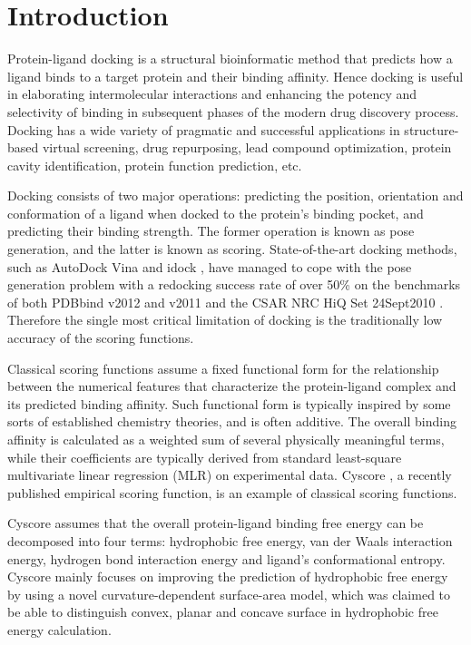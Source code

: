 \documentclass[journal=jacsat,manuscript=article]{achemso}
\begin{document}
\section{Introduction}

Protein-ligand docking is a structural bioinformatic method that predicts how a ligand binds to a target protein and their binding affinity. Hence docking is useful in elaborating intermolecular interactions and enhancing the potency and selectivity of binding in subsequent phases of the modern drug discovery process. Docking has a wide variety of pragmatic and successful applications in structure-based virtual screening, drug repurposing, lead compound optimization, protein cavity identification, protein function prediction, etc.

Docking consists of two major operations: predicting the position, orientation and conformation of a ligand when docked to the protein's binding pocket, and predicting their binding strength. The former operation is known as pose generation, and the latter is known as scoring. State-of-the-art docking methods, such as AutoDock Vina \cite{595} and idock \cite{1153}, have managed to cope with the pose generation problem with a redocking success rate of over 50\% \cite{1362} on the benchmarks of both PDBbind v2012 and v2011 \cite{529,530} and the CSAR NRC HiQ Set 24Sept2010 \cite{857,960}. Therefore the single most critical limitation of docking is the traditionally low accuracy of the scoring functions.

Classical scoring functions assume a fixed functional form for the relationship between the numerical features that characterize the protein-ligand complex and its predicted binding affinity. Such functional form is typically inspired by some sorts of established chemistry theories, and is often additive. The overall binding affinity is calculated as a weighted sum of several physically meaningful terms, while their coefficients are typically derived from standard least-square multivariate linear regression (MLR) on experimental data. Cyscore \cite{1372}, a recently published empirical scoring function, is an example of classical scoring functions.

Cyscore assumes that the overall protein-ligand binding free energy can be decomposed into four terms: hydrophobic free energy, van der Waals interaction energy, hydrogen bond interaction energy and ligand's conformational entropy. Cyscore mainly focuses on improving the prediction of hydrophobic free energy by using a novel curvature-dependent surface-area model, which was claimed to be able to distinguish convex, planar and concave surface in hydrophobic free energy calculation.
\end{document}
